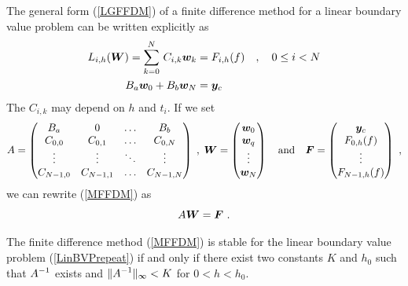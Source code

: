 The general form (\ref{LGFFDM}) of a finite difference method for a
linear boundary value problem can be written explicitly as
\begin{equation} \label{MFFDM}
\begin{split}
L_{i,h}(\bm{W}) = \sum_{k=0}^N\,C_{i,k} \bm{w}_k
& = F_{i,h}(f) \quad , \quad  0 \leq i < N \\
B_a\bm{w}_0 + B_b\bm{w}_N &= \bm{y}_c
\end{split}
\end{equation}
The $C_{i,k}$ may depend on $h$ and $t_i$.  If we set
\[
A = \begin{pmatrix}
B_a & 0 & \ldots & B_b \\
C_{0,0} & C_{0,1} & \ldots & C_{0,N} \\
\vdots & \vdots & \ddots & \vdots \\
C_{N-1,0} & C_{N-1,1} & \ldots & C_{N-1,N}
\end{pmatrix} \; , \;
\bm{W} = \begin{pmatrix}
\bm{w}_0 \\ \bm{w}_q \\ \vdots \\ \bm{w}_N
\end{pmatrix}
\quad \text{and} \quad
\bm{F} = \begin{pmatrix}
\bm{y}_c \\ F_{0,h}(f) \\ \vdots \\ F_{N-1,h}(f)
\end{pmatrix}  \ ,
\]
we can rewrite (\ref{MFFDM}) as
\begin{equation} \label{AWFfromFDM}
  A \bm{W} = \bm{F} \ .
\end{equation}

\begin{prop}
The finite difference method (\ref{MFFDM}) is stable for the linear
boundary value problem (\ref{LinBVPrepeat}) if and only if there exist
two constants $K$ and $h_0$ such that $\displaystyle A^{-1}$ exists and
$\displaystyle \| A^{-1} \|_\infty < K$ for $0< h < h_0$.
\label{BasicFDM}
\end{prop}

